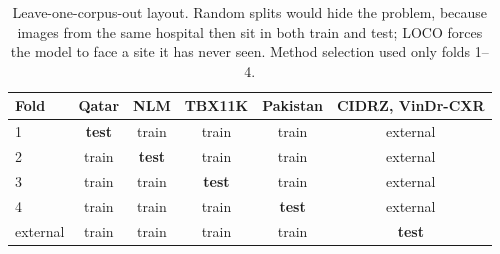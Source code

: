 \documentclass[10pt,a4paper]{article}
\begin{document}
\begin{table}[H]\centering\small
\begin{tabular}{lcccc|c}\toprule
Fold & Qatar & NLM & TBX11K & Pakistan & CIDRZ, VinDr-CXR\\\midrule
1 & \textbf{test} & train & train & train & external\\
2 & train & \textbf{test} & train & train & external\\
3 & train & train & \textbf{test} & train & external\\
4 & train & train & train & \textbf{test} & external\\
external & train & train & train & train & \textbf{test}\\\bottomrule
\end{tabular}\caption{Leave-one-corpus-out layout. Random splits would hide the problem, because images from the same hospital then sit in both train and test; LOCO forces the model to face a site it has never seen. Method selection used only folds 1--4.}\end{table}
\end{document}
